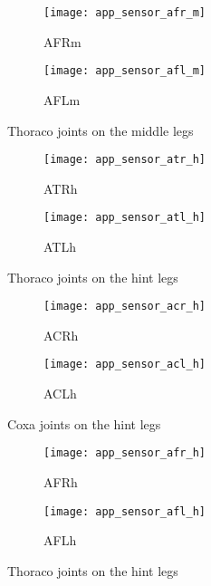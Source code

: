 \begin{figure}[H]
\centering
\begin{subfigure}{0.48\textwidth}
  \centering
  \texttt{[image: app\_sensor\_afr\_m]}
  \caption{AFRm}
  \label{fig:app_afr_m}
\end{subfigure}
\begin{subfigure}{0.48\textwidth}
  \centering
  \texttt{[image: app\_sensor\_afl\_m]}
  \caption{AFLm}
  \label{fig:app_afl_m}
\end{subfigure}
\caption{Thoraco joints on the middle legs}
\label{fig:app_af_m}
\end{figure}

\begin{figure}[H]
\centering
\begin{subfigure}{0.48\textwidth}
  \centering
  \texttt{[image: app\_sensor\_atr\_h]}
  \caption{ATRh}
  \label{fig:app_atr_h}
\end{subfigure}
\begin{subfigure}{0.48\textwidth}
  \centering
  \texttt{[image: app\_sensor\_atl\_h]}
  \caption{ATLh}
  \label{fig:app_atl_h}
\end{subfigure}
\caption{Thoraco joints on the hint legs}
\label{fig:app_at_h}
\end{figure}

\begin{figure}[H]
\centering
\begin{subfigure}{0.48\textwidth}
  \centering
  \texttt{[image: app\_sensor\_acr\_h]}
  \caption{ACRh}
  \label{fig:app_acr_h}
\end{subfigure}
\begin{subfigure}{0.48\textwidth}
  \centering
  \texttt{[image: app\_sensor\_acl\_h]}
  \caption{ACLh}
  \label{fig:app_acl_h}
\end{subfigure}
\caption{Coxa joints on the hint legs}
\label{fig:app_ac_h}
\end{figure}

\begin{figure}[H]
\centering
\begin{subfigure}{0.48\textwidth}
  \centering
  \texttt{[image: app\_sensor\_afr\_h]}
  \caption{AFRh}
  \label{fig:app_afr_h}
\end{subfigure}
\begin{subfigure}{0.48\textwidth}
  \centering
  \texttt{[image: app\_sensor\_afl\_h]}
  \caption{AFLh}
  \label{fig:app_afl_h}
\end{subfigure}
\caption{Thoraco joints on the hint legs}
\label{fig:app_af_h}
\end{figure}

